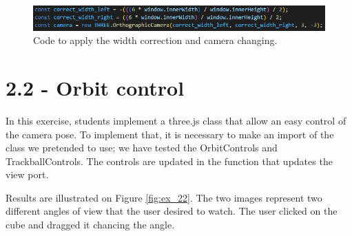 \documentclass[12pt]{article}
\begin{document}
\begin{figure}[!h]
    \centering
        \includegraphics[width = \textwidth]{figs/ex_21_code.png}
        \caption{Code to apply the width correction and camera changing.}
        \label{figs:ex_21_code}
\end{figure}

\section*{2.2 - Orbit control}
\label{ex_22}

In this exercise, students implement a three.js class that allow an easy control of the camera pose. To implement that, it is necessary to make an import of the class we pretended to use; we have tested the OrbitControls and TrackballControls. The controls are updated in the function that updates the view port.\par

Results are illustrated on Figure \ref{fig:ex_22}. The two images represent two different angles of view that the user desired to watch. The user clicked on the cube and dragged it chancing the angle.
\end{document}
